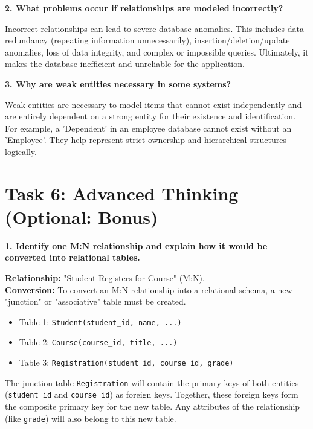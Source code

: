 \documentclass[12pt,a4paper]{article}
\begin{document}
\vspace{0.5cm}

\textbf{2. What problems occur if relationships are modeled incorrectly?}

Incorrect relationships can lead to severe database anomalies. This includes data redundancy (repeating information unnecessarily), insertion/deletion/update anomalies, loss of data integrity, and complex or impossible queries. Ultimately, it makes the database inefficient and unreliable for the application.

\vspace{0.5cm}

\textbf{3. Why are weak entities necessary in some systems?}

Weak entities are necessary to model items that cannot exist independently and are entirely dependent on a strong entity for their existence and identification. For example, a 'Dependent' in an employee database cannot exist without an 'Employee'. They help represent strict ownership and hierarchical structures logically.


\vspace{1cm}
\section*{Task 6: Advanced Thinking (Optional: Bonus)}

\textbf{1. Identify one M:N relationship and explain how it would be converted into relational tables.}

\textbf{Relationship:} "Student Registers for Course" (M:N). \\
\textbf{Conversion:} To convert an M:N relationship into a relational schema, a new "junction" or "associative" table must be created. 
\begin{itemize}
    \item Table 1: \texttt{Student(student\_id, name, ...)}
    \item Table 2: \texttt{Course(course\_id, title, ...)}
    \item Table 3: \texttt{Registration(student\_id, course\_id, grade)}
\end{itemize}
The junction table \texttt{Registration} will contain the primary keys of both entities (\texttt{student\_id} and \texttt{course\_id}) as foreign keys. Together, these foreign keys form the composite primary key for the new table. Any attributes of the relationship (like \texttt{grade}) will also belong to this new table.
\end{document}
